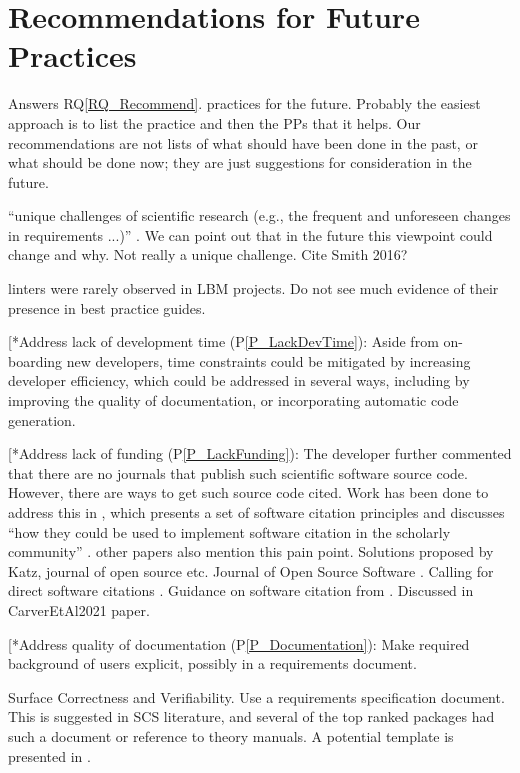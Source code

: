 \documentclass[runningheads]{llncs}
\newcommand{\rqref}[1]{RQ\ref{#1}}
\newcommand{\ppref}[1]{P\ref{#1}}
\begin{document}
\section{Recommendations for Future Practices} \label{Sec_Recommendations}

Answers \rqref{RQ_Recommend}.  practices for the future.  Probably the easiest
approach is to list the practice and then the PPs that it helps.  Our
recommendations are not lists of what should have been done in the past, or what
should be done now; they are just suggestions for consideration in the future.

``unique challenges of scientific research (e.g., the frequent and unforeseen
changes in requirements ...)'' \cite{PintoEtAl2018}. We can point out that in
the future this viewpoint could change and why.  Not really a unique challenge.
Cite Smith 2016?

linters \cite{Zadka2018} were rarely observed in LBM projects.  Do not see much
evidence of their presence in best practice guides.

[*{Address lack of development time (\ppref{P_LackDevTime}): Aside from
on-boarding new developers, time constraints could be mitigated by increasing
developer efficiency, which could be addressed in several ways, including by
improving the quality of documentation, or incorporating automatic code
generation.} 

[*{Address lack of funding (\ppref{P_LackFunding}): The developer further
commented that there are no journals that publish such scientific software
source code. However, there are ways to get such source code cited. Work has
been done to address this in \cite{SmithEtAl2016-softcite}, which presents a
set of software citation principles and discusses ``how they could be used to
implement software citation in the scholarly community''
\cite{katz2019software}. other papers also mention this pain point.
Solutions proposed by Katz, journal of open source etc. Journal of Open Source
Software \cite{SmithEtAl2018-joss}.  Calling for direct software citations
\cite{SmithEtAl2016-softcite}.  Guidance on software citation from
\cite{KatzEtAl2021}.  Discussed in CarverEtAl2021 paper.}

[*{Address quality of documentation (\ppref{P_Documentation}): Make required
background of users explicit, possibly in a requirements document.}

Surface Correctness and Verifiability. Use a requirements
specification document. This is suggested in SCS literature, and several of
the top ranked packages had such a document or reference to theory manuals.
A potential template is presented in \cite{smith2005new}. 
\end{document}
